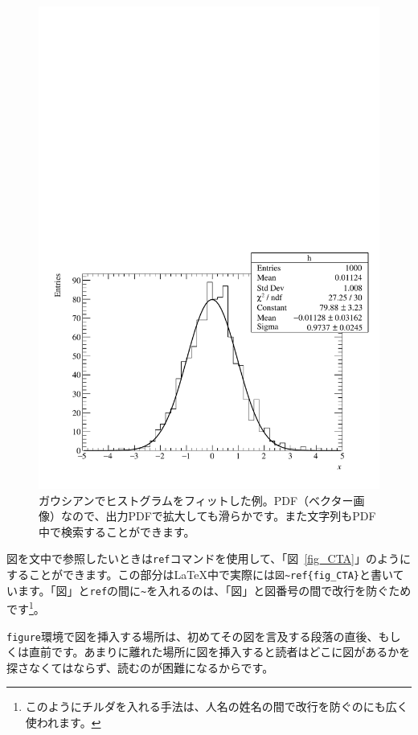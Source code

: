 \begin{figure}
  \centering
  \includegraphics[width=14cm]{fig/histogram.pdf}
  \caption[ガウシアンでヒストグラムをフィットした例]{ガウシアンでヒストグラムをフィットした例。PDF（ベクター画像）なので、出力PDFで拡大しても滑らかです。また文字列もPDF中で検索することができます。}
  \label{fig_histogram}
\end{figure}

図を文中で参照したいときは\texttt{ref}コマンドを使用して、「図~\ref{fig_CTA}」のようにすることができます。この部分は\LaTeX{}中で実際には\texttt{図\~{}\bs{}ref\{fig\_CTA\}}と書いています。「図」と\texttt{\bs{}ref}の間に\texttt{\~{}}を入れるのは、「図」と図番号の間で改行を防ぐためです\footnote{このようにチルダを入れる手法は、人名の姓名の間で改行を防ぐのにも広く使われます。}。

\texttt{figure}環境で図を挿入する場所は、初めてその図を言及する段落の直後、もしくは直前です。あまりに離れた場所に図を挿入すると読者はどこに図があるかを探さなくてはならず、読むのが困難になるからです。

